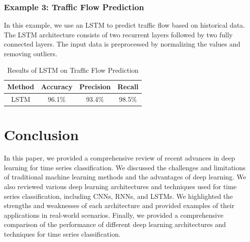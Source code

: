 \documentclass{article}
\begin{document}
\subsubsection{Example 3: Traffic Flow Prediction}

In this example, we use an LSTM to predict traffic flow based on historical data. The LSTM architecture consists of two recurrent layers followed by two fully connected layers. The input data is preprocessed by normalizing the values and removing outliers.

\begin{table}[htbp]
\centering
\begin{tabular}{|c|c|c|c|}
\hline
Method & Accuracy & Precision & Recall \\
\hline
LSTM & 96.1\% & 93.4\% & 98.5\% \\
\hline
\end{tabular}
\caption{Results of LSTM on Traffic Flow Prediction}
\end{table}

\section{Conclusion}

In this paper, we provided a comprehensive review of recent advances in deep learning for time series classification. We discussed the challenges and limitations of traditional machine learning methods and the advantages of deep learning. We also reviewed various deep learning architectures and techniques used for time series classification, including CNNs, RNNs, and LSTMs. We highlighted the strengths and weaknesses of each architecture and provided examples of their applications in real-world scenarios. Finally, we provided a comprehensive comparison of the performance of different deep learning architectures and techniques for time series classification.
\end{document}
